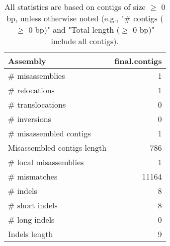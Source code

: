 \documentclass[12pt,a4paper]{article}
\begin{document}
\begin{table}[ht]
\begin{center}
\caption{All statistics are based on contigs of size $\geq$ 0 bp, unless otherwise noted (e.g., "\# contigs ($\geq$ 0 bp)" and "Total length ($\geq$ 0 bp)" include all contigs).}
\begin{tabular}{|l*{1}{|r}|}
\hline
Assembly & final.contigs \\ \hline
\# misassemblies & 1 \\ \hline
\hspace{5mm}\# relocations & 1 \\ \hline
\hspace{5mm}\# translocations & 0 \\ \hline
\hspace{5mm}\# inversions & 0 \\ \hline
\# misassembled contigs & 1 \\ \hline
Misassembled contigs length & 786 \\ \hline
\# local misassemblies & 1 \\ \hline
\# mismatches & 11164 \\ \hline
\# indels & 8 \\ \hline
\hspace{5mm}\# short indels & 8 \\ \hline
\hspace{5mm}\# long indels & 0 \\ \hline
Indels length & 9 \\ \hline
\end{tabular}
\end{center}
\end{table}
\end{document}
